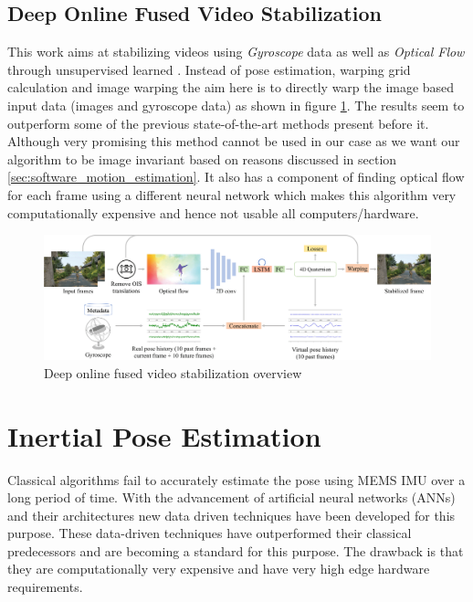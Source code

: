 \subsection{Deep Online Fused Video Stabilization}
This work aims at stabilizing videos using \textit{Gyroscope} data as well as \textit{Optical Flow} through unsupervised learned \citep{deep_opti_stab}. Instead of pose estimation, warping grid calculation and image warping the aim here is to directly warp the image based input data (images and gyroscope data) as shown in figure \ref{fig:deep_stab}. The results seem to outperform some of the previous state-of-the-art methods present before it. Although very promising this method cannot be used in our case as we want our algorithm to be image invariant based on reasons discussed in section \ref{sec:software_motion_estimation}. It also has a component of finding optical flow for each frame using a different neural network which makes this algorithm very computationally expensive and hence not usable all computers/hardware.

\begin{figure}[H]
    \centering
    \includegraphics[scale=0.066]{images/fig_chapter3/deep_stab.png}
    \caption{Deep online fused video stabilization overview \citep{deep_opti_stab}}
    \label{fig:deep_stab}
\end{figure}

\section{Inertial Pose Estimation}
\label{sec:sota_pose_est}
Classical algorithms fail to accurately estimate the pose using MEMS IMU over a long period of time. With the advancement of artificial neural networks (ANNs) and their architectures new data driven techniques have been developed for this purpose. These data-driven techniques have outperformed their classical predecessors and are becoming a standard for this purpose. The drawback is that they are computationally very expensive and have very high edge hardware requirements. 

